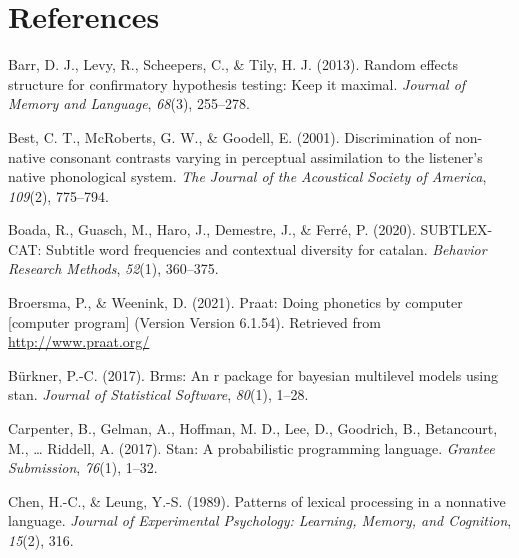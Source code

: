 \documentclass[
  english,
  man,floatsintext]{apa6}
\newlength{\cslhangindent}
\newenvironment{CSLReferences}[2] %
 {%
  \setlength{\parindent}{0pt}
  \ifodd #1 \everypar{\setlength{\hangindent}{\cslhangindent}}\ignorespaces\fi
  \ifnum #2 > 0
  \setlength{\parskip}{#2\baselineskip}
  \fi
 }%
 {}
\begin{document}
\newpage

\hypertarget{references}{%
\section{References}\label{references}}

\begingroup
\setlength{\parindent}{-0.5in}
\setlength{\leftskip}{0.5in}

\hypertarget{refs}{}
\begin{CSLReferences}{1}{0}
\leavevmode{}%
Barr, D. J., Levy, R., Scheepers, C., \& Tily, H. J. (2013). Random effects structure for confirmatory hypothesis testing: Keep it maximal. \emph{Journal of Memory and Language}, \emph{68}(3), 255--278.

\leavevmode{}%
Best, C. T., McRoberts, G. W., \& Goodell, E. (2001). Discrimination of non-native consonant contrasts varying in perceptual assimilation to the listener's native phonological system. \emph{The Journal of the Acoustical Society of America}, \emph{109}(2), 775--794.

\leavevmode{}%
Boada, R., Guasch, M., Haro, J., Demestre, J., \& Ferré, P. (2020). SUBTLEX-CAT: Subtitle word frequencies and contextual diversity for catalan. \emph{Behavior Research Methods}, \emph{52}(1), 360--375.

\leavevmode{}%
Broersma, P., \& Weenink, D. (2021). Praat: Doing phonetics by computer {[}computer program{]} (Version Version 6.1.54). Retrieved from \url{http://www.praat.org/}

\leavevmode{}%
Bürkner, P.-C. (2017). Brms: An r package for bayesian multilevel models using stan. \emph{Journal of Statistical Software}, \emph{80}(1), 1--28.

\leavevmode{}%
Carpenter, B., Gelman, A., Hoffman, M. D., Lee, D., Goodrich, B., Betancourt, M., \ldots{} Riddell, A. (2017). Stan: A probabilistic programming language. \emph{Grantee Submission}, \emph{76}(1), 1--32.

\leavevmode{}%
Chen, H.-C., \& Leung, Y.-S. (1989). Patterns of lexical processing in a nonnative language. \emph{Journal of Experimental Psychology: Learning, Memory, and Cognition}, \emph{15}(2), 316.


\end{CSLReferences}
\end{document}
